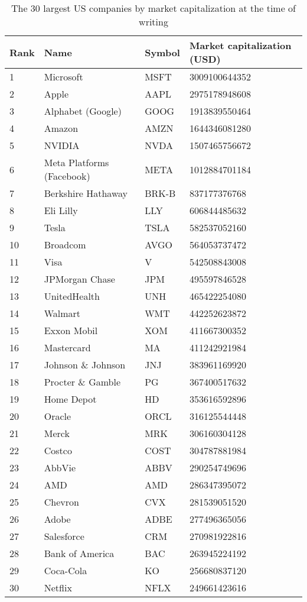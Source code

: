\begin{table}[h]
    \centering
    \begin{tabular}{|l|l|l|l|} 
        \hline
        \textbf{Rank} & \textbf{Name} & \textbf{Symbol} & \textbf{Market capitalization (USD)} \\
        \hline
        1 & Microsoft & MSFT & 3009100644352 \\
        2 & Apple & AAPL & 2975178948608 \\
        3 & Alphabet (Google) & GOOG & 1913839550464 \\
        4 & Amazon & AMZN & 1644346081280 \\
        5 & NVIDIA & NVDA & 1507465756672 \\
        6 & Meta Platforms (Facebook) & META & 1012884701184 \\
        7 & Berkshire Hathaway & BRK-B & 837177376768 \\
        8 & Eli Lilly & LLY & 606844485632 \\
        9 & Tesla & TSLA & 582537052160 \\
        10 & Broadcom & AVGO & 564053737472 \\
        11 & Visa & V & 542508843008 \\
        12 & JPMorgan Chase & JPM & 495597846528 \\
        13 & UnitedHealth & UNH & 465422254080 \\
        14 & Walmart & WMT & 442252623872 \\
        15 & Exxon Mobil & XOM & 411667300352 \\
        16 & Mastercard & MA & 411242921984 \\
        17 & Johnson \& Johnson & JNJ & 383961169920 \\
        18 & Procter \& Gamble & PG & 367400517632 \\
        19 & Home Depot & HD & 353616592896 \\
        20 & Oracle & ORCL & 316125544448 \\
        21 & Merck & MRK & 306160304128 \\
        22 & Costco & COST & 304787881984 \\
        23 & AbbVie & ABBV & 290254749696 \\
        24 & AMD & AMD & 286347395072 \\
        25 & Chevron & CVX & 281539051520 \\
        26 & Adobe & ADBE & 277496365056 \\
        27 & Salesforce & CRM & 270981922816 \\
        28 & Bank of America & BAC & 263945224192 \\
        29 & Coca-Cola & KO & 256680837120 \\
        30 & Netflix & NFLX & 249661423616
        \\
        \hline
    \end{tabular}
    \caption{The 30 largest US companies by market capitalization at the time of writing}
    \label{table:companies}
\end{table}